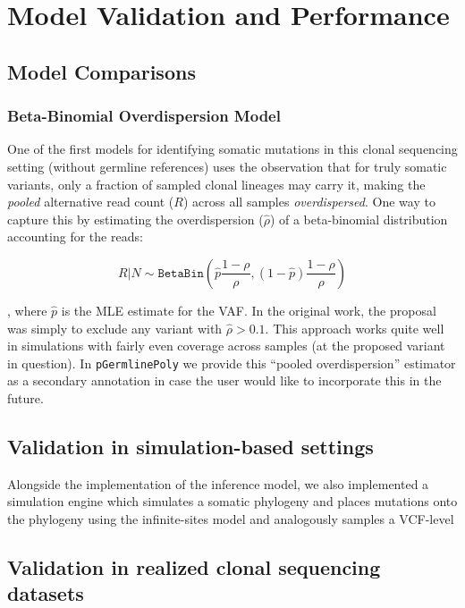 \documentclass{article}
\begin{document}
\section*{Model Validation and Performance}

\subsection*{Model Comparisons}

\subsubsection*{Beta-Binomial Overdispersion Model}

One of the first models for identifying somatic mutations in this clonal sequencing setting (without germline references) \citep{Spencer-Chapman2021-cy} uses the observation that for truly somatic variants, only a fraction of sampled clonal lineages may carry it, making the \textit{pooled} alternative read count ($R$) across all samples \textit{overdispersed}. One way to capture this by estimating the overdispersion ($\hat{\rho}$) of a beta-binomial distribution accounting for the reads:

$$
R | N \sim \texttt{BetaBin}\left(\hat{p}\frac{1 - \rho}{\rho}, (1 - \hat{p})\frac{1-\rho}{\rho}\right)
$$

, where $\hat{p}$ is the MLE estimate for the VAF. In the original work\citep{Spencer-Chapman2021-cy}, the proposal was simply to exclude any variant with $\hat{\rho} > 0.1$. This approach works quite well in simulations with fairly even coverage across samples (at the proposed variant in question). In \texttt{pGermlinePoly} we provide this ``pooled overdispersion'' estimator as a secondary annotation in case the user would like to incorporate this in the future.



\subsection*{Validation in simulation-based settings}

Alongside the implementation of the inference model, we also implemented a simulation engine which simulates a somatic phylogeny and places mutations onto the phylogeny using the infinite-sites model and analogously samples a VCF-level


\lipsum[3]



\subsection*{Validation in realized clonal sequencing datasets}




\end{document}
